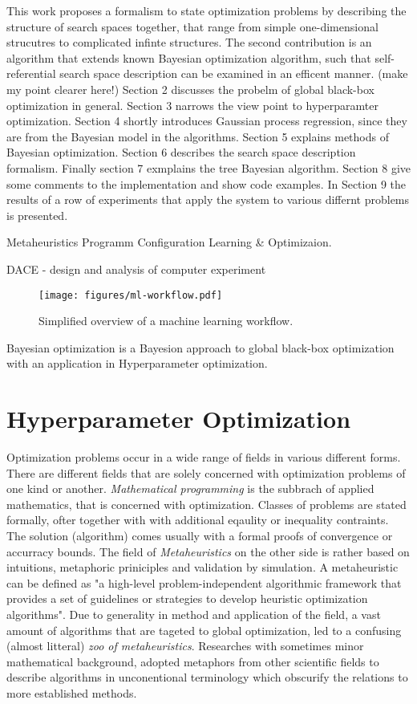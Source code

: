 \documentclass[english]{article}
\begin{document}
This work proposes a formalism to state optimization problems by describing the structure of search spaces together, that range from simple one-dimensional strucutres to complicated infinte structures. The second contribution is an algorithm that extends known Bayesian optimization algorithm, such that self-referential search space description can be examined in an efficent manner.
(make my point clearer here!)
Section 2 discusses the probelm of global black-box optimization in general. Section 3 narrows the view point to hyperparamter optimization.
Section 4 shortly introduces Gaussian process regression, since they are from the Bayesian model in the algorithms.
Section 5 explains methods of Bayesian optimization.
Section 6 describes the search space description formalism.
Finally section 7 exmplains the tree Bayesian algorithm.
Section 8 give some comments to the implementation and show code examples.
In Section 9 the results of a row of experiments that apply the system to various differnt problems is presented.

Metaheuristics
Programm Configuration
Learning \& Optimizaion.

DACE - design and analysis of computer experiment

\begin{figure}
  \texttt{[image: figures/ml-workflow.pdf]}
  \caption{Simplified overview of a machine learning workflow.}
  \label{ml-workflow}
\end{figure}

Bayesian optimization is a Bayesion approach to global black-box optimization with an application in Hyperparameter optimization.

\section{Hyperparameter Optimization}
Optimization problems occur in a wide range of fields in various different forms. There are different fields that are solely concerned with optimization problems of one kind or another. \textit{Mathematical programming} is the subbrach of applied mathematics, that is concerned with optimization. Classes of problems are stated formally, ofter together with with additional eqaulity or inequality contraints. The solution (algorithm) comes usually with a formal proofs of convergence or accurracy bounds. The field of \textit{Metaheuristics}
on the other side is rather based on intuitions, metaphoric priniciples and validation by simulation. A metaheuristic can be defined as "a high-level problem-independent algorithmic framework that provides a set of guidelines or strategies to develop heuristic optimization algorithms". \cite{sorensen_history_2014} Due to generality in method and application of the field, a vast amount of algorithms that are tageted to global optimization, led to a confusing (almost litteral) \textit{zoo of metaheuristics}. Researches with sometimes minor mathematical background, adopted metaphors from other scientific fields to describe algorithms in unconentional terminology which obscurify the relations to more established methods. \cite{sorensen_metaheuristics-metaphor_2015}
\end{document}
